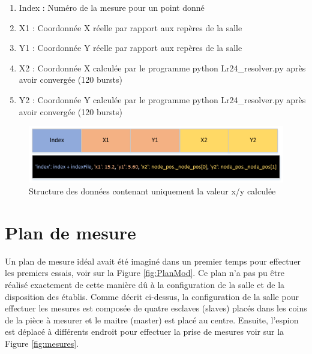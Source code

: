 \begin{enumerate}
	\item Index : Numéro de la mesure pour un point donné
	\item X1 : Coordonnée X réelle par rapport aux repères de la salle 
	\item Y1 : Coordonnée Y réelle par rapport aux repères de la salle 
	\item X2 : Coordonnée X calculée par le programme python Lr24\_resolver.py après avoir convergée (120 bursts)
	\item Y2 : Coordonnée Y calculée par le programme python Lr24\_resolver.py après avoir convergée (120 bursts)
\end{enumerate}

\begin{figure}[htp]
	\begin{center}
		\includegraphics[scale=0.7]{figures/dataStruct2.png}
		\caption{Structure des données contenant uniquement la valeur x/y calculée}
		\label{fig:dataStruct2} %
	\end{center}
\end{figure}

\section{Plan de mesure}
Un plan de mesure idéal avait été imaginé dans un premier temps pour effectuer les premiers essais, voir sur la Figure \ref{fig:PlanMod}. Ce plan n'a pas pu être réalisé exactement de cette manière dû à la configuration de la salle et de la disposition des établis. Comme décrit ci-dessus, la configuration de la salle pour effectuer les mesures est composée de quatre esclaves (slaves) placés dans les coins de la pièce à mesurer et le maitre (master) est placé au centre. Ensuite, l'espion est déplacé à différents endroit pour effectuer la prise de mesures voir sur la Figure \ref{fig:mesures}.

